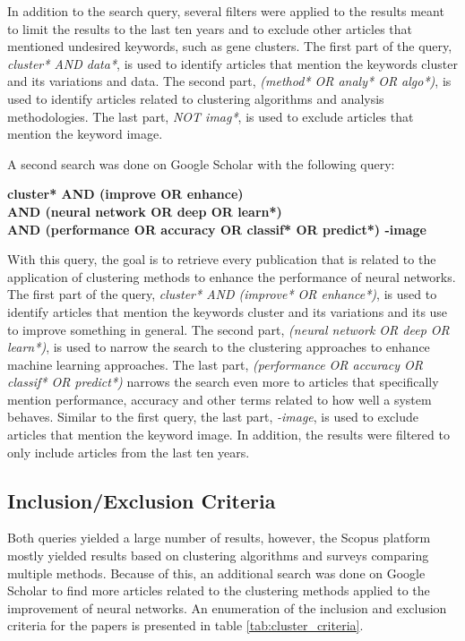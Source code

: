 In addition to the search query, several filters were applied to the results meant to limit the results to the last ten years and to exclude other articles that mentioned undesired keywords, such as gene clusters. The first part of the query, \textit{cluster* AND data*}, is used to identify articles that mention the keywords cluster and its variations and data. The second part, \textit{(method* OR analy* OR algo*)}, is used to identify articles related to clustering algorithms and analysis methodologies. The last part, \textit{NOT imag*}, is used to exclude articles that mention the keyword image.

A second search was done on Google Scholar with the following query:
\begin{center}
    \textbf{cluster* AND (improve OR enhance) \\AND (neural network OR deep OR learn*) \\AND (performance OR accuracy OR classif* OR predict*) -image}
\end{center}

With this query, the goal is to retrieve every publication that is related to the application of clustering methods to enhance the performance of neural networks. The first part of the query, \textit{cluster* AND (improve* OR enhance*)}, is used to identify articles that mention the keywords cluster and its variations and its use to improve something in general. The second part, \textit{(neural network OR deep OR learn*)}, is used to narrow the search to the clustering approaches to enhance machine learning approaches. The last part, \textit{(performance OR accuracy OR classif* OR predict*)} narrows the search even more to articles that specifically mention performance, accuracy and other terms related to how well a system behaves. Similar to the first query, the last part, \textit{-image}, is used to exclude articles that mention the keyword image. In addition, the results were filtered to only include articles from the last ten years.


\subsection{Inclusion/Exclusion Criteria}\label{sec:cluster_inclusion_exclusion}
Both queries yielded a large number of results, however, the Scopus platform mostly yielded results based on clustering algorithms and surveys comparing multiple methods. Because of this, an additional search was done on Google Scholar to find more articles related to the clustering methods applied to the improvement of neural networks. An enumeration of the inclusion and exclusion criteria for the papers is presented in table \ref{tab:cluster_criteria}.


